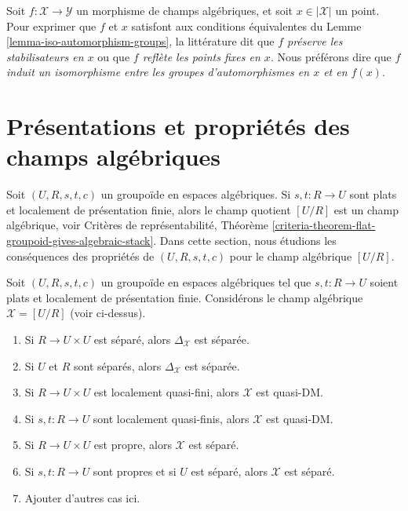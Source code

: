 \begin{remark}
\label{remark-identify-automorphism-groups}
Soit $f : \mathcal{X} \to \mathcal{Y}$ un morphisme de champs algébriques,
et soit $x \in |\mathcal{X}|$ un point. Pour exprimer que $f$ et $x$
satisfont aux conditions équivalentes du
Lemme \ref{lemma-iso-automorphism-groups}, la littérature dit que
{\it $f$ préserve les stabilisateurs en $x$} ou que
{\it $f$ reflète les points fixes en $x$}.
Nous préférons dire que {\it $f$ induit un isomorphisme entre les groupes
d'automorphismes en $x$ et en $f(x)$}.
\end{remark}





\section{Présentations et propriétés des champs algébriques}
\label{section-presentations-properties}

\noindent
Soit $(U, R, s, t, c)$ un groupoïde en espaces algébriques.
Si $s, t : R \to U$ sont plats et localement de présentation finie,
alors le champ quotient $[U/R]$ est un champ algébrique, voir
Critères de représentabilité, Théorème
\ref{criteria-theorem-flat-groupoid-gives-algebraic-stack}.
Dans cette section, nous étudions les conséquences des propriétés de
$(U, R, s, t, c)$ pour le champ algébrique $[U/R]$.

\begin{lemma}
\label{lemma-properties-diagonal-from-presentation}
Soit $(U, R, s, t, c)$ un groupoïde en espaces algébriques tel que
$s, t : R \to U$ soient plats et localement de présentation finie.
Considérons le champ algébrique $\mathcal{X} = [U/R]$ (voir ci-dessus).
\begin{enumerate}
\item Si $R \to U \times U$ est séparé, alors
$\Delta_\mathcal{X}$ est séparée.
\item Si $U$ et $R$ sont séparés, alors $\Delta_\mathcal{X}$ est séparée.
\item Si $R \to U \times U$ est localement quasi-fini, alors $\mathcal{X}$
est quasi-DM.
\item Si $s, t : R \to U$ sont localement quasi-finis, alors
$\mathcal{X}$ est quasi-DM.
\item Si $R \to U \times U$ est propre, alors $\mathcal{X}$ est séparé.
\item Si $s, t : R \to U$ sont propres et si $U$ est séparé, alors
$\mathcal{X}$ est séparé.
\item Ajouter d'autres cas ici.
\end{enumerate}
\end{lemma}

